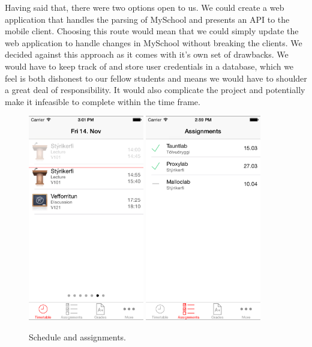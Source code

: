 \documentclass[pdftex, DIV=calc, paper=a4, fontsize=11pt]{scrartcl}	 %
\begin{document}
Having said that, there were two options open to us. We could create a web application that handles
the parsing of MySchool and presents an API to the mobile client. Choosing this route would mean that
we could simply update the web application to handle changes in MySchool without breaking the 
clients. We decided against this approach as it comes with it's own set of drawbacks. We would have
to keep track of and store user credentials in a database, which we feel is both dishonest to our
fellow students and means we would have to shoulder a great deal of responsibility. It would also 
complicate the project and potentially make it infeasible to complete within the time frame.

\begin{figure}[t]
    \centering
    \includegraphics[width=0.45\textwidth]{schedule.png}
    \hspace{0.2in}
    \includegraphics[width=0.45\textwidth]{assignments.png}
    \caption{Schedule and assignments.}
    \label{fig:grades}
\end{figure}
\end{document}
